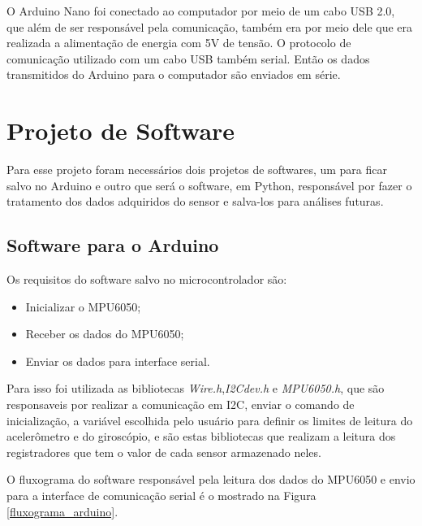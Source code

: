 		O Arduino Nano foi conectado ao computador por meio de um cabo USB 2.0, que além de ser responsável pela comunicação, também era por meio dele que era realizada a alimentação de energia com 5V de tensão. O protocolo de comunicação utilizado com um cabo USB também serial. Então os dados transmitidos do Arduino para o computador são enviados em série. 
		
		
\section {Projeto de Software}
		
		Para esse projeto foram necessários dois projetos de softwares, um para ficar salvo no Arduino e outro que será o software, em Python, responsável por fazer o tratamento dos dados adquiridos do sensor e salva-los para análises futuras.
		
		\subsection{Software para o Arduino}
			Os requisitos do software salvo no microcontrolador são:
			\begin{itemize}
				\item Inicializar o MPU6050;
				\item Receber os dados do MPU6050; 
				\item Enviar os dados para interface serial.
			\end{itemize}
		
		Para isso foi utilizada as bibliotecas \textit{Wire.h},\textit{I2Cdev.h} e \textit{MPU6050.h}, que são responsaveis por realizar a comunicação em I2C, enviar o comando de inicialização, a variável escolhida pelo usuário para definir os limites de leitura do acelerômetro e do giroscópio, e são estas bibliotecas que realizam a leitura dos registradores que tem o valor de cada sensor armazenado neles.  
		
		O fluxograma do software responsável pela leitura dos dados do MPU6050 e envio para a interface de comunicação serial é o mostrado na Figura \ref{fluxograma_arduino}. 
		
